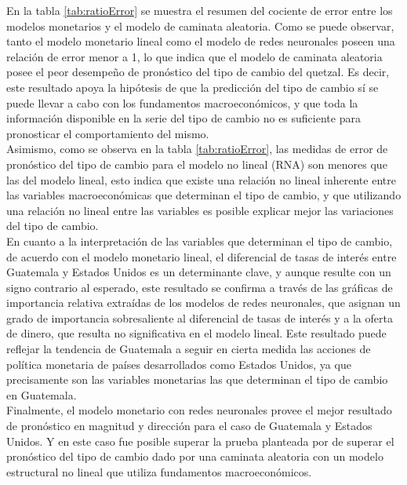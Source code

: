 En la tabla \ref{tab:ratioError} se muestra el resumen del cociente de error entre los modelos monetarios y el modelo de caminata aleatoria. Como se puede observar, tanto el modelo monetario lineal como el modelo de redes neuronales poseen una relación de error menor a 1, lo que indica que el modelo de caminata aleatoria posee el peor desempeño de pronóstico del tipo de cambio del quetzal. Es decir, este resultado apoya la hipótesis de que la predicción del tipo de cambio sí se puede llevar a cabo con los fundamentos macroeconómicos, y que toda la información disponible en la serie del tipo de cambio no es suficiente para pronosticar el comportamiento del mismo.\\



Asimismo, como se observa en la tabla \ref{tab:ratioError}, las medidas de error de pronóstico del tipo de cambio para el modelo no lineal (RNA) son menores que las del modelo lineal, esto indica que existe una relación no lineal inherente entre las variables macroeconómicas que determinan el tipo de cambio, y que utilizando una relación no lineal entre las variables es posible explicar mejor las variaciones del tipo de cambio.\\

En cuanto a la interpretación de las variables que determinan el tipo de cambio, de acuerdo con el modelo monetario lineal, el diferencial de tasas de interés entre Guatemala y Estados Unidos es un determinante clave, y aunque resulte con un signo contrario al esperado, este resultado se confirma a través de las gráficas de importancia relativa extraídas de los modelos de redes neuronales, que asignan un grado de importancia sobresaliente al diferencial de tasas de interés y a la oferta de dinero, que resulta no significativa en el modelo lineal. Este resultado puede reflejar la tendencia de Guatemala a seguir en cierta medida las acciones de política monetaria de países desarrollados como Estados Unidos, ya que precisamente son las variables monetarias las que determinan el tipo de cambio en Guatemala.\\

Finalmente, el modelo monetario con redes neuronales provee el mejor resultado de pronóstico en magnitud y dirección para el caso de Guatemala y Estados Unidos. Y en este caso fue posible superar la prueba planteada por \textcite{meese1983empirical} de superar el pronóstico del tipo de cambio dado por una caminata aleatoria con un modelo estructural no lineal que utiliza fundamentos macroeconómicos.

